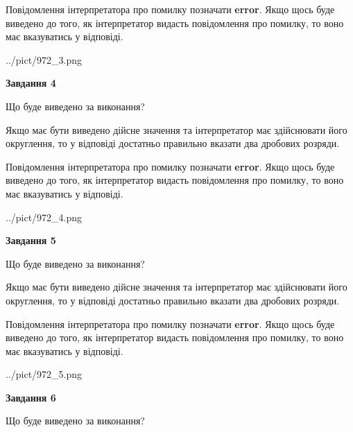 \documentclass[12pt, ukrainian]{article}
\begin{document}
{\begin {Large}
Повідомлення інтерпретатора про помилку позначати \textbf{error}.
Якщо щось буде виведено до того, як інтерпретатор видасть повідомлення про помилку, 
то воно має вказуватись у відповіді. \par

\begin{center}
	{../pict/972_3.png}
\end{center}
\newpage

{\begin {center}\textbf{Завдання 4}\end {center}}\par
Що буде виведено за виконання? \par

Якщо має бути виведено дійсне значення та інтерпретатор має здійснювати його округлення, 
то у відповіді достатньо правильно вказати два дробових розряди.

Повідомлення інтерпретатора про помилку позначати \textbf{error}.
Якщо щось буде виведено до того, як інтерпретатор видасть повідомлення про помилку, 
то воно має вказуватись у відповіді. \par

\begin{center}
	{../pict/972_4.png}
\end{center}
\newpage

{\begin {center}\textbf{Завдання 5}\end {center}}\par
Що буде виведено за виконання? \par

Якщо має бути виведено дійсне значення та інтерпретатор має здійснювати його округлення, 
то у відповіді достатньо правильно вказати два дробових розряди.

Повідомлення інтерпретатора про помилку позначати \textbf{error}.
Якщо щось буде виведено до того, як інтерпретатор видасть повідомлення про помилку, 
то воно має вказуватись у відповіді. \par

\begin{center}
	{../pict/972_5.png}
\end{center}
\newpage

{\begin {center}\textbf{Завдання 6}\end {center}}\par
Що буде виведено за виконання? \par


\end{Large}}
\end{document}
